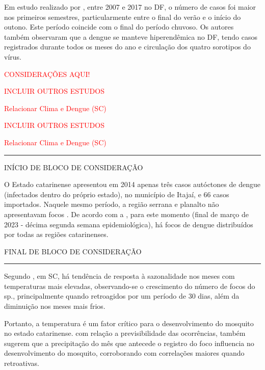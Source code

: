 \indent Em estudo realizado por , entre 2007 e 2017 no \acrfull{DF}, o número de casos foi maior nos primeiros semestres, particularmente entre o final do verão e o início do outono. Este período  coincide com o final do período chuvoso. Os autores também observaram que a dengue se manteve hiperendêmica no \acrlong{DF}, tendo casos registrados durante todos os meses do ano e circulação dos quatro sorotipos do vírus.

\begin{center}
\textcolor{red}{CONSIDERAÇÕES AQUI!}
\end{center}

\textcolor{red}{INCLUIR OUTROS ESTUDOS}

\textcolor{red}{Relacionar Clima e Dengue (SC)}

\textcolor{red}{INCLUIR OUTROS ESTUDOS}

\textcolor{red}{Relacionar Clima e Dengue (SC)}

{\color{red} \rule{\linewidth}{0.5mm}}

\color{red} INÍCIO DE BLOCO DE CONSIDERAÇÃO

\indent O Estado catarinense apresentou em 2014 apenas três casos autóctones de dengue (infectados dentro do próprio estado), no município de Itajaí, e 66 casos importados. Naquele mesmo período, a região serrana e planalto não apresentavam focos \cite{Matiola2020Dissertação}. De acordo com a , para este momento (final de março de 2023 - décima segunda semana epidemiológica), há focos de dengue distribuídos por todas as regiões catarinenses.

FINAL DE BLOCO DE CONSIDERAÇÃO

{\color{red} \rule{\linewidth}{0.5mm}}

\color{black}

\indent Segundo , em \acrlong{SC}, há tendência de resposta à sazonalidade nos meses com temperaturas mais elevadas, observando-se o crescimento do número de focos do  sp.,  principalmente quando retroagidos por um período de 30 dias, além da diminuição nos meses mais frios.

\indent Portanto, a temperatura é um fator crítico para o desenvolvimento do mosquito no estado catarinense. com relação a previsibilidade das ocorrências,  também sugerem que a precipitação do mês que antecede o registro do foco influencia no desenvolvimento do mosquito, corroborando com correlações maiores quando retroativas.

